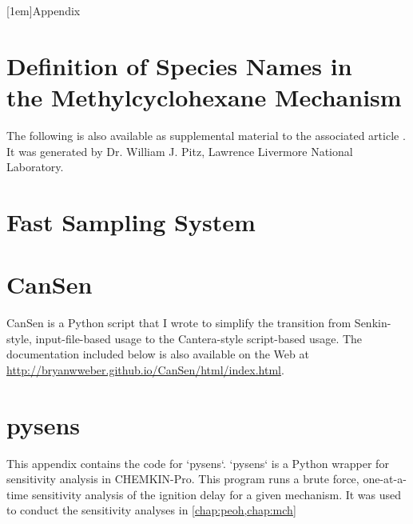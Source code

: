 \documentclass[12pt,letterpaper,oneside,draft]{book}
\begin{document}
\begin{appendices}
\makeatletter
\addappheadtotoc
{}
[1em]{}{Appendix \thecontentslabel\quad}{}{\contentspage}
%
\makeatother
{}

\chapter[Definition of Species Names in the Methylcyclohexane Mechanism]%
{Definition of Species Names in\\the Methylcyclohexane Mechanism}
\label{app:mch-dict}
The following is also available as supplemental material to the associated article \cite{Weber2014}.
It was generated by Dr. William J. Pitz, Lawrence Livermore National Laboratory.



\chapter{Fast Sampling System}
\label{app:fast-sampling-system}



\chapter{CanSen}
\label{app:cansen}
CanSen is a Python script that I wrote to simplify the transition from
Senkin-style, input-file-based usage to the Cantera-style script-based usage.
The documentation included below is also available on the Web at
\url{http://bryanwweber.github.io/CanSen/html/index.html}.



\chapter{pysens}
This appendix contains the code for `pysens`. `pysens` is a Python wrapper
for sensitivity analysis in CHEMKIN-Pro. This program runs a brute
force, one-at-a-time sensitivity analysis of the ignition delay for a
given mechanism. It was used to conduct the sensitivity analyses in
\cref{chap:peoh,chap:mch}

\blankline



\end{appendices}
\end{document}
